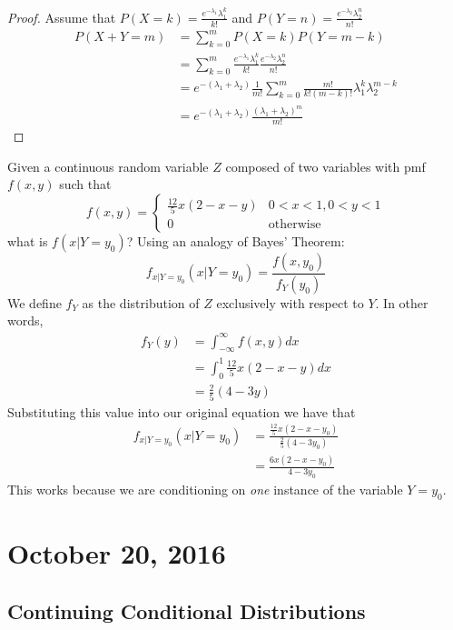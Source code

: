 \documentclass[11pt]{article}
\theoremstyle{definition}
\begin{document}
\begin{proof}	Assume that $P(X = k) = \frac{e^{-\lambda_1} \lambda_1^k}{k!}$ and $P(Y = n) = \frac{e^{-\lambda_2} \lambda_2^n}{n!}$
		\begin{align*}
		P(X + Y = m)	&= \sum_{k=0}^m P(X=k) P(Y=m-k)\\
					&= \sum_{k=0}^m  \frac{e^{-\lambda_1} \lambda_1^k}{k!} \frac{e^{-\lambda_2} \lambda_2^n}{n!}\\
					&= e^{-(\lambda_1+\lambda_2)} \frac{1}{m!}\sum_{k=0}^m  \frac{m!}{k!(m-k)!}\lambda_1^k \lambda_2^{m-k}\\
					&= e^{-(\lambda_1+\lambda_2)} \frac{(\lambda_1 + \lambda_2)^m}{m!}
		\end{align*}\end{proof}
\example Given a continuous random variable $Z$ composed of two variables with pmf $f(x,y)$ such that 
\begin{equation*}
f(x,y) = \begin{cases}
\frac{12}{5} x(2-x-y) & 0 < x < 1, 0 < y < 1\\
0 & \text{otherwise}
\end{cases}
\end{equation*}
		what is $f(x|Y=y_0)$?
		Using an analogy of Bayes' Theorem:
			$$f_{x|Y=y_0}(x|Y=y_0) = \frac{f(x, y_0)}{f_Y(y_0)}$$
		We define $f_Y$ as the distribution of $Z$ exclusively with respect to $Y$. In other words, 
			\begin{align*}
			f_Y(y) &= \int_{-\infty}^{\infty}f(x,y)dx\\
				  &= \int_{0}^{1}\frac{12}{5} x (2 - x - y)dx\\
				  &= \frac{2}{5}(4 - 3 y)
			\end{align*}
		Substituting this value into our original equation we have that
			\begin{align*}
			f_{x|Y=y_0}(x|Y=y_0) &= \frac{\frac{12}{5} x (2 - x - y_0)}{\frac{2}{5}(4 - 3 y_0)}\\
					 &= \frac{6x (2 - x - y_0)}{4-3y_0}
			\end{align*}
This works because we are conditioning on \textit{one} instance of the variable $Y = y_0$.
\section{October 20, 2016}

\subsection{Continuing Conditional Distributions}
\end{document}
